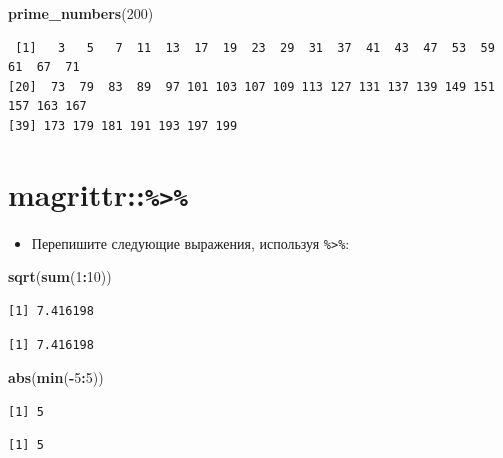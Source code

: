 \documentclass[
]{book}
\newenvironment{Shaded}{\begin{snugshade}}{\end{snugshade}}
\newcommand{\DecValTok}[1]{\textcolor[rgb]{0.00,0.00,0.81}{#1}}
\newcommand{\KeywordTok}[1]{\textcolor[rgb]{0.13,0.29,0.53}{\textbf{#1}}}
\newcommand{\NormalTok}[1]{#1}
\newcommand{\OperatorTok}[1]{\textcolor[rgb]{0.81,0.36,0.00}{\textbf{#1}}}
\providecommand{\tightlist}{%
  \setlength{\itemsep}{0pt}\setlength{\parskip}{0pt}}
\begin{document}
\begin{Shaded}
\begin{Highlighting}[]
\KeywordTok{prime_numbers}\NormalTok{(}\DecValTok{200}\NormalTok{)}
\end{Highlighting}
\end{Shaded}

\begin{verbatim}
 [1]   3   5   7  11  13  17  19  23  29  31  37  41  43  47  53  59  61  67  71
[20]  73  79  83  89  97 101 103 107 109 113 127 131 137 139 149 151 157 163 167
[39] 173 179 181 191 193 197 199
\end{verbatim}

\hypertarget{task_pipe}{%
\section{\texorpdfstring{magrittr::\texttt{\%\textgreater{}\%}}{magrittr::\%\textgreater\%}}\label{task_pipe}}

\begin{itemize}
\tightlist
\item
  Перепишите следующие выражения, используя \texttt{\%\textgreater{}\%}:
\end{itemize}

\begin{Shaded}
\begin{Highlighting}[]
\KeywordTok{sqrt}\NormalTok{(}\KeywordTok{sum}\NormalTok{(}\DecValTok{1}\OperatorTok{:}\DecValTok{10}\NormalTok{))}
\end{Highlighting}
\end{Shaded}

\begin{verbatim}
[1] 7.416198
\end{verbatim}

\begin{verbatim}
[1] 7.416198
\end{verbatim}

\begin{Shaded}
\begin{Highlighting}[]
\KeywordTok{abs}\NormalTok{(}\KeywordTok{min}\NormalTok{(}\OperatorTok{-}\DecValTok{5}\OperatorTok{:}\DecValTok{5}\NormalTok{))}
\end{Highlighting}
\end{Shaded}

\begin{verbatim}
[1] 5
\end{verbatim}

\begin{verbatim}
[1] 5
\end{verbatim}
\end{document}
